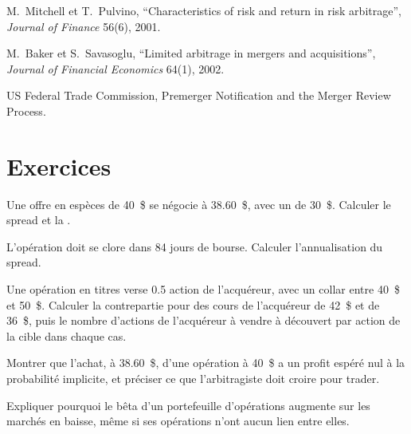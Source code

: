 \begin{omsources}
\item M.~Mitchell et T.~Pulvino, ``Characteristics of risk and return in risk arbitrage'', \emph{Journal of Finance} 56(6), 2001.
\item M.~Baker et S.~Savasoglu, ``Limited arbitrage in mergers and acquisitions'', \emph{Journal of Financial Economics} 64(1), 2002.
\item US Federal Trade Commission, Premerger Notification and the Merger Review Process.
\end{omsources}

\section{Exercices}

\begin{exercise}[$\star$]\label{exo:s1:merger-arbitrage:1}
Une offre en espèces de 40~\$ se négocie à 38.60~\$, avec un  de 30~\$. Calculer le spread et la .
\end{exercise}

\begin{exercise}[$\star$]\label{exo:s1:merger-arbitrage:2}
L'opération doit se clore dans 84 jours de bourse. Calculer l'annualisation du spread.
\end{exercise}

\begin{exercise}[$\star$]\label{exo:s1:merger-arbitrage:3}
Une opération en titres verse 0.5 action de l'acquéreur, avec un collar entre 40~\$ et 50~\$. Calculer la contrepartie pour des cours de l'acquéreur de 42~\$ et de 36~\$, puis le
nombre d'actions de l'acquéreur à vendre à découvert par action de la cible dans chaque cas.
\end{exercise}

\begin{exercise}[$\star\star$]\label{exo:s1:merger-arbitrage:4}
Montrer que l'achat, à 38.60~\$, d'une opération à 40~\$ a un profit espéré nul à la probabilité implicite, et préciser ce que l'arbitragiste doit croire pour trader.
\end{exercise}

\begin{exercise}[$\star\star$]\label{exo:s1:merger-arbitrage:5}
Expliquer pourquoi le bêta d'un portefeuille d'opérations augmente sur les marchés en baisse, même si ses opérations n'ont aucun lien entre elles.
\end{exercise}

